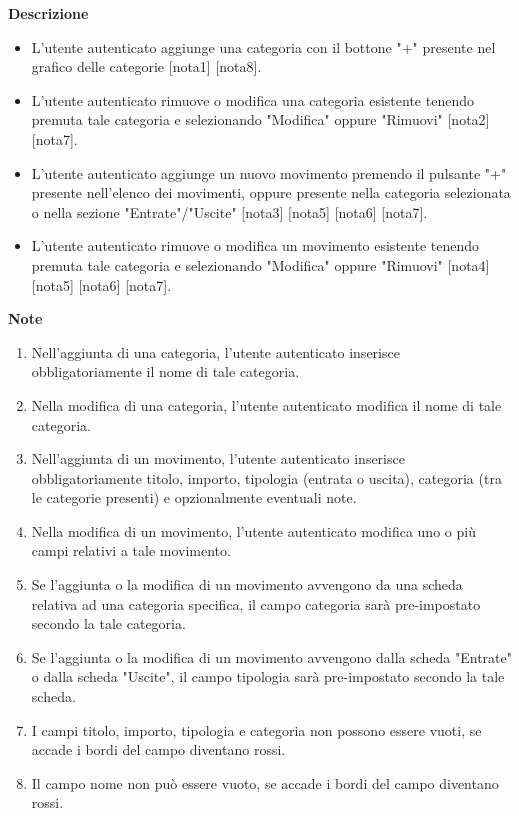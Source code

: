 \documentclass[a4paper,12pt]{article}
\begin{document}
\textbf{Descrizione}
\begin{itemize} \setlength\itemsep{0.01em}
\item L'utente autenticato aggiunge una categoria con il bottone "+" presente nel grafico delle categorie [nota1] [nota8].
\item L'utente autenticato rimuove o modifica una categoria esistente tenendo premuta tale categoria e selezionando "Modifica" oppure "Rimuovi" [nota2] [nota7].
\item L'utente autenticato aggiunge un nuovo movimento premendo il pulsante "+" presente nell'elenco dei movimenti, oppure presente nella categoria selezionata o nella sezione "Entrate"/"Uscite" [nota3] [nota5] [nota6] [nota7].
\item L'utente autenticato rimuove o modifica un movimento esistente tenendo premuta tale categoria e selezionando "Modifica" oppure "Rimuovi" [nota4] [nota5] [nota6] [nota7].
\end{itemize}

\textbf{Note}
\begin{enumerate} \setlength\itemsep{0.01em}
\item Nell'aggiunta di una categoria, l'utente autenticato inserisce obbligatoriamente il nome di tale categoria.
\item Nella modifica di una categoria, l'utente autenticato modifica il nome di tale categoria.
\item Nell'aggiunta di un movimento, l'utente autenticato inserisce obbligatoriamente titolo, importo, tipologia (entrata o uscita), categoria (tra le categorie presenti) e opzionalmente eventuali note.
\item Nella modifica di un movimento, l'utente autenticato modifica uno o più campi relativi a tale movimento.
\item Se l'aggiunta o la modifica di un movimento avvengono da una scheda relativa ad una categoria specifica, il campo categoria sarà pre-impostato secondo la tale categoria.
\item Se l'aggiunta o la modifica di un movimento avvengono dalla scheda "Entrate" o dalla scheda "Uscite", il campo tipologia sarà pre-impostato secondo la tale scheda.
\item I campi titolo, importo, tipologia e categoria non possono essere vuoti, se accade i bordi del campo diventano rossi.
\item Il campo nome non può essere vuoto, se accade i bordi del campo diventano rossi.
\end{enumerate}
\end{document}

